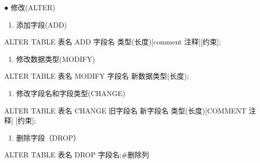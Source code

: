 \documentclass[
  letterpaper,
  DIV=11,
  numbers=noendperiod]{scrreprt}
\newenvironment{Shaded}{\begin{snugshade}}{\end{snugshade}}
\newcommand{\KeywordTok}[1]{\textcolor[rgb]{0.00,0.23,0.31}{#1}}
\newcommand{\NormalTok}[1]{\textcolor[rgb]{0.00,0.23,0.31}{#1}}
\providecommand{\tightlist}{%
  \setlength{\itemsep}{0pt}\setlength{\parskip}{0pt}}\usepackage{longtable,booktabs,array}
\begin{document}
● 修改(ALTER)

\begin{enumerate}
\def\labelenumi{\arabic{enumi}.}
\tightlist
\item
  添加字段(ADD)
\end{enumerate}

\begin{Shaded}
\begin{Highlighting}[]
\KeywordTok{ALTER} \KeywordTok{TABLE}\NormalTok{ 表名 }\KeywordTok{ADD}\NormalTok{ 字段名 类型(长度)[}\KeywordTok{comment}\NormalTok{ 注释][约束];}
\end{Highlighting}
\end{Shaded}

\begin{enumerate}
\def\labelenumi{\arabic{enumi}.}
\setcounter{enumi}{1}
\tightlist
\item
  修改数据类型(MODIFY)
\end{enumerate}

\begin{Shaded}
\begin{Highlighting}[]
\KeywordTok{ALTER} \KeywordTok{TABLE}\NormalTok{ 表名 }\KeywordTok{MODIFY}\NormalTok{ 字段名 新数据类型(长度);}
\end{Highlighting}
\end{Shaded}

\begin{enumerate}
\def\labelenumi{\arabic{enumi}.}
\setcounter{enumi}{2}
\tightlist
\item
  修改字段名和字段类型(CHANGE)
\end{enumerate}

\begin{Shaded}
\begin{Highlighting}[]
\KeywordTok{ALTER} \KeywordTok{TABLE}\NormalTok{ 表名 }\KeywordTok{CHANGE}\NormalTok{ 旧字段名 新字段名 类型(长度)[}\KeywordTok{COMMENT}\NormalTok{ 注释] [约束];}
\end{Highlighting}
\end{Shaded}

\begin{enumerate}
\def\labelenumi{\arabic{enumi}.}
\setcounter{enumi}{3}
\tightlist
\item
  删除字段（DROP）
\end{enumerate}

\begin{Shaded}
\begin{Highlighting}[]
\KeywordTok{ALTER} \KeywordTok{TABLE}\NormalTok{ 表名 }\KeywordTok{DROP}\NormalTok{ 字段名;\#删除列}
\end{Highlighting}
\end{Shaded}
\end{document}
